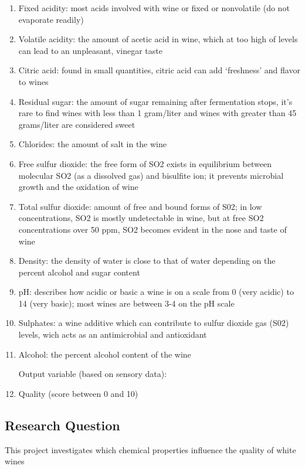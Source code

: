 \documentclass[]{article}
\begin{document}
\begin{enumerate}
\def\labelenumi{\arabic{enumi}.}
\item
  Fixed acidity: most acids involved with wine or fixed or nonvolatile
  (do not evaporate readily)
\item
  Volatile acidity: the amount of acetic acid in wine, which at too high
  of levels can lead to an unpleasant, vinegar taste
\item
  Citric acid: found in small quantities, citric acid can add
  `freshness' and flavor to wines
\item
  Residual sugar: the amount of sugar remaining after fermentation
  stops, it's rare to find wines with less than 1 gram/liter and wines
  with greater than 45 grams/liter are considered sweet
\item
  Chlorides: the amount of salt in the wine
\item
  Free sulfur dioxide: the free form of SO2 exists in equilibrium
  between molecular SO2 (as a dissolved gas) and bisulfite ion; it
  prevents microbial growth and the oxidation of wine
\item
  Total sulfur dioxide: amount of free and bound forms of S02; in low
  concentrations, SO2 is mostly undetectable in wine, but at free SO2
  concentrations over 50 ppm, SO2 becomes evident in the nose and taste
  of wine
\item
  Density: the density of water is close to that of water depending on
  the percent alcohol and sugar content
\item
  pH: describes how acidic or basic a wine is on a scale from 0 (very
  acidic) to 14 (very basic); most wines are between 3-4 on the pH scale
\item
  Sulphates: a wine additive which can contribute to sulfur dioxide gas
  (S02) levels, wich acts as an antimicrobial and antioxidant
\item
  Alcohol: the percent alcohol content of the wine

  Output variable (based on sensory data):
\item
  Quality (score between 0 and 10)
\end{enumerate}

\subsection{Research Question}\label{research-question}

This project investigates which chemical properties influence the
quality of white wines
\end{document}

